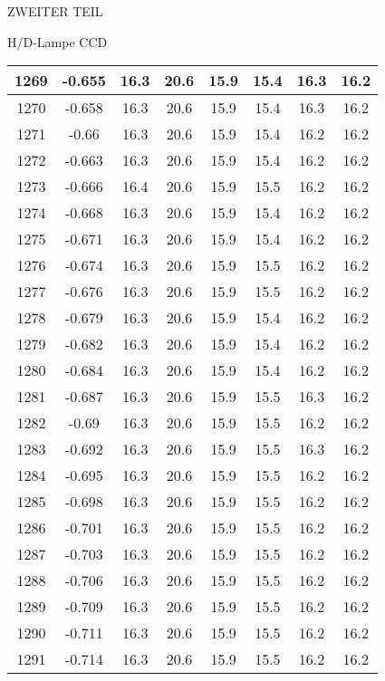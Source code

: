 \begin{appendix}
\begin{chapter}{ZWEITER TEIL}
\begin{section}{H/D-Lampe CCD}
\begin{scriptsize}
\begin{longtable}[htbp]{|c|c|c|c|c|c|c|c|}
            1269 & -0.655 & 16.3 & 20.6 & 15.9 & 15.4 & 16.3 & 16.2 \\ \hline
            1270 & -0.658 & 16.3 & 20.6 & 15.9 & 15.4 & 16.3 & 16.2 \\ \hline
            1271 & -0.66 & 16.3 & 20.6 & 15.9 & 15.4 & 16.2 & 16.2 \\ \hline
            1272 & -0.663 & 16.3 & 20.6 & 15.9 & 15.4 & 16.2 & 16.2 \\ \hline
            1273 & -0.666 & 16.4 & 20.6 & 15.9 & 15.5 & 16.2 & 16.2 \\ \hline
            1274 & -0.668 & 16.3 & 20.6 & 15.9 & 15.4 & 16.2 & 16.2 \\ \hline
            1275 & -0.671 & 16.3 & 20.6 & 15.9 & 15.4 & 16.2 & 16.2 \\ \hline
            1276 & -0.674 & 16.3 & 20.6 & 15.9 & 15.5 & 16.2 & 16.2 \\ \hline
            1277 & -0.676 & 16.3 & 20.6 & 15.9 & 15.5 & 16.2 & 16.2 \\ \hline
            1278 & -0.679 & 16.3 & 20.6 & 15.9 & 15.4 & 16.2 & 16.2 \\ \hline
            1279 & -0.682 & 16.3 & 20.6 & 15.9 & 15.4 & 16.2 & 16.2 \\ \hline
            1280 & -0.684 & 16.3 & 20.6 & 15.9 & 15.4 & 16.2 & 16.2 \\ \hline
            1281 & -0.687 & 16.3 & 20.6 & 15.9 & 15.5 & 16.3 & 16.2 \\ \hline
            1282 & -0.69 & 16.3 & 20.6 & 15.9 & 15.5 & 16.2 & 16.2 \\ \hline
            1283 & -0.692 & 16.3 & 20.6 & 15.9 & 15.5 & 16.3 & 16.2 \\ \hline
            1284 & -0.695 & 16.3 & 20.6 & 15.9 & 15.5 & 16.2 & 16.2 \\ \hline
            1285 & -0.698 & 16.3 & 20.6 & 15.9 & 15.5 & 16.2 & 16.2 \\ \hline
            1286 & -0.701 & 16.3 & 20.6 & 15.9 & 15.5 & 16.2 & 16.2 \\ \hline
            1287 & -0.703 & 16.3 & 20.6 & 15.9 & 15.5 & 16.2 & 16.2 \\ \hline
            1288 & -0.706 & 16.3 & 20.6 & 15.9 & 15.5 & 16.2 & 16.2 \\ \hline
            1289 & -0.709 & 16.3 & 20.6 & 15.9 & 15.5 & 16.2 & 16.2 \\ \hline
            1290 & -0.711 & 16.3 & 20.6 & 15.9 & 15.5 & 16.2 & 16.2 \\ \hline
            1291 & -0.714 & 16.3 & 20.6 & 15.9 & 15.5 & 16.2 & 16.2 \\ \hline

\end{longtable}
\end{scriptsize}
\end{section}
\end{chapter}
\end{appendix}

